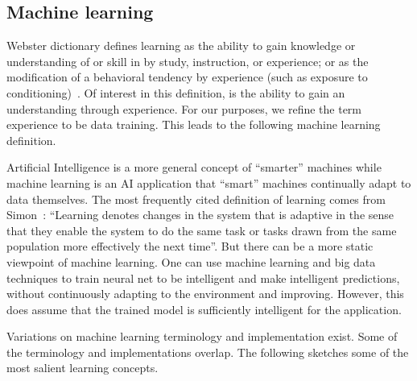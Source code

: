 \subsection{Machine learning}
\label{chapter2}
\textit{}
Webster dictionary defines learning as the ability to gain knowledge or understanding of or skill in by study, instruction, or experience; or as the modification of a behavioral tendency by experience (such as exposure to conditioning)~\cite{learningdef}. Of interest in this definition, is the ability to gain an understanding through experience. For our purposes, we refine the term experience to be data training. This leads to the following machine learning definition. 

Artificial Intelligence is a more general concept of ``smarter'' machines while machine learning is an AI application that ``smart'' machines continually adapt to data themselves. The most frequently cited definition of learning comes from Simon~\cite{simon1983should}: ``Learning denotes changes in the system that is adaptive in the sense that they enable the system to do the same task or tasks drawn from the same population more effectively the next time''.  But there can be a more static viewpoint of machine learning. One can use machine learning and big data techniques to train neural net to be intelligent and make  intelligent predictions, without continuously adapting to the environment and improving.  However, this does assume that the trained model is sufficiently intelligent for the  application.

Variations on machine learning terminology and implementation exist. Some of the terminology and implementations overlap. The following sketches some of the most salient learning concepts.

